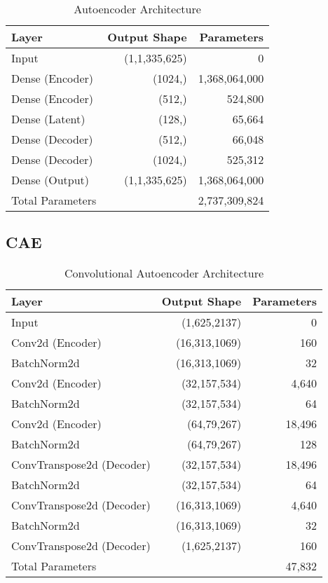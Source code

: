 \begin{table}[!h]
    \centering
    \begin{tabular}{lrr}
        \toprule
        Layer & Output Shape & Parameters \\
        \midrule
        Input & (1,1,335,625) & 0 \\
        Dense (Encoder) & (1024,) & 1,368,064,000 \\
        Dense (Encoder) & (512,) & 524,800 \\
        Dense (Latent) & (128,) & 65,664 \\
        Dense (Decoder) & (512,) & 66,048 \\
        Dense (Decoder) & (1024,) & 525,312 \\
        Dense (Output) & (1,1,335,625) & 1,368,064,000 \\
        \midrule
        Total Parameters & & 2,737,309,824 \\
        \bottomrule
    \end{tabular}
    \caption{Autoencoder Architecture}
    \label{tab:ae}
\end{table}


\subsection{CAE}
\label{app:a-cae}

\begin{table}[!h]
    \centering
    \begin{tabular}{lrr}
        \toprule
        Layer & Output Shape & Parameters \\
        \midrule
        Input & (1,625,2137) & 0 \\
        Conv2d (Encoder) & (16,313,1069) & 160 \\
        BatchNorm2d & (16,313,1069) & 32 \\
        Conv2d (Encoder) & (32,157,534) & 4,640 \\
        BatchNorm2d & (32,157,534) & 64 \\
        Conv2d (Encoder) & (64,79,267) & 18,496 \\
        BatchNorm2d & (64,79,267) & 128 \\
        ConvTranspose2d (Decoder) & (32,157,534) & 18,496 \\
        BatchNorm2d & (32,157,534) & 64 \\
        ConvTranspose2d (Decoder) & (16,313,1069) & 4,640 \\
        BatchNorm2d & (16,313,1069) & 32 \\
        ConvTranspose2d (Decoder) & (1,625,2137) & 160 \\
        \midrule
        Total Parameters & & 47,832 \\
        \bottomrule
    \end{tabular}
    \caption{Convolutional Autoencoder Architecture}
    \label{tab:cae}
\end{table}



